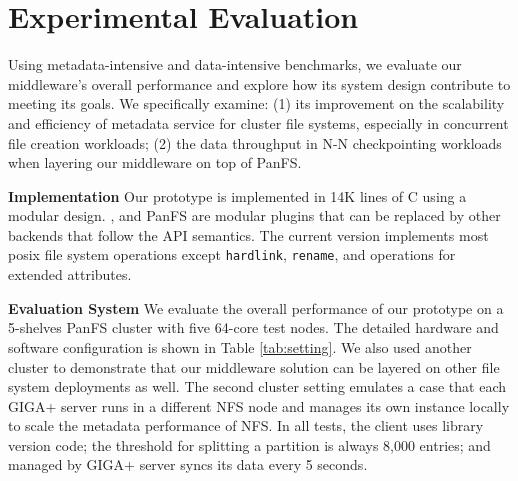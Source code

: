 \section{Experimental Evaluation}

Using metadata-intensive and data-intensive benchmarks,
we evaluate our middleware's overall performance
and explore how its system design contribute to meeting its goals.
We specifically examine: (1) its improvement on the scalability and
efficiency of metadata service for cluster file systems,
especially in concurrent file creation workloads;
(2) the data throughput in N-N checkpointing workloads
when layering our middleware on top of PanFS.

\textbf{Implementation}
Our prototype is implemented in 14K lines of C using a modular design.
\tfs, \ldb and PanFS are modular plugins that can be replaced by other backends
that follow the API semantics. The current version implements most posix
file system operations except \texttt{hardlink}, \texttt{rename},
and operations for extended attributes.

\textbf{Evaluation System }
We evaluate the overall performance of our prototype on
a 5-shelves PanFS cluster with five 64-core test nodes. The detailed hardware
and software configuration is shown in Table \ref{tab:setting}.
We also used another cluster to demonstrate that our middleware solution
can be layered on other file system deployments as well.
The second cluster setting emulates a case that each GIGA+ server runs in
a different NFS node and manages its own \tfs instance locally
to scale the metadata performance of NFS.
In all tests, the client uses library version code;
the threshold for splitting a partition is always 8,000 entries;
and \tfs managed by GIGA+ server syncs its data every 5 seconds.

